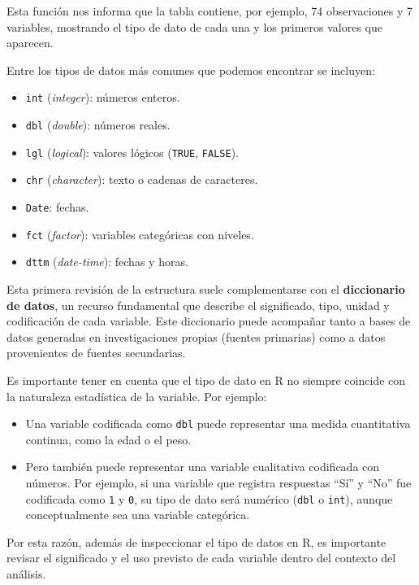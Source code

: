 \documentclass[
  spanish,
  a4paper,
]{scrbook}
\begin{document}
Esta función nos informa que la tabla contiene, por ejemplo, 74
observaciones y 7 variables, mostrando el tipo de dato de cada una y los
primeros valores que aparecen.

Entre los tipos de datos más comunes que podemos encontrar se incluyen:

\begin{itemize}
\item
  \texttt{int} (\emph{integer}): números enteros.
\item
  \texttt{dbl} (\emph{double}): números reales.
\item
  \texttt{lgl} (\emph{logical}): valores lógicos (\texttt{TRUE},
  \texttt{FALSE}).
\item
  \texttt{chr} (\emph{character}): texto o cadenas de caracteres.
\item
  \texttt{Date}: fechas.
\item
  \texttt{fct} (\emph{factor}): variables categóricas con niveles.
\item
  \texttt{dttm} (\emph{date-time}): fechas y horas.
\end{itemize}

Esta primera revisión de la estructura suele complementarse con el
\textbf{diccionario de datos}, un recurso fundamental que describe el
significado, tipo, unidad y codificación de cada variable. Este
diccionario puede acompañar tanto a bases de datos generadas en
investigaciones propias (fuentes primarias) como a datos provenientes de
fuentes secundarias.

Es importante tener en cuenta que el tipo de dato en R no siempre
coincide con la naturaleza estadística de la variable. Por ejemplo:

\begin{itemize}
\item
  Una variable codificada como \texttt{dbl} puede representar una medida
  cuantitativa continua, como la edad o el peso.
\item
  Pero también puede representar una variable cualitativa codificada con
  números. Por ejemplo, si una variable que registra respuestas ``Sí'' y
  ``No'' fue codificada como \texttt{1} y \texttt{0}, su tipo de dato
  será numérico (\texttt{dbl} o \texttt{int}), aunque conceptualmente
  sea una variable categórica.
\end{itemize}

Por esta razón, además de inspeccionar el tipo de datos en R, es
importante revisar el significado y el uso previsto de cada variable
dentro del contexto del análisis.
\end{document}
